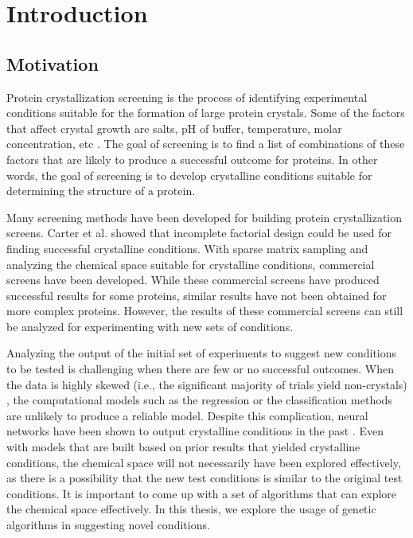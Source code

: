 \chapter{Introduction}
\label{ch:background}

\section{Motivation} \label{intro:motivation}
Protein crystallization screening is the process of identifying experimental conditions suitable for the formation of large protein crystals. Some of the factors that affect crystal growth are salts, pH of buffer, temperature, molar concentration, etc \cite{IntroFactor,History,McPherson}. The goal of screening is to find a list of combinations of these factors that are likely to produce a successful outcome for proteins. In other words, the goal of screening is to develop crystalline conditions suitable for determining the structure of a protein. 

Many screening methods have been developed for building protein crystallization screens. Carter et al. \cite{carter1979protein} showed that incomplete factorial design could be used for finding successful crystalline conditions. With sparse matrix sampling \cite{jancarik1991sparse} and analyzing the chemical space suitable for crystalline conditions, commercial screens have been developed. While these commercial screens have produced successful results for some proteins, similar results have not been obtained for more complex proteins. However, the results of these commercial screens can still be analyzed for experimenting with new sets of conditions.

Analyzing the output of the initial set of experiments to suggest new conditions to be tested is challenging when there are few or no successful outcomes. When the data is highly skewed (i.e., the significant majority of trials yield non-crystals) \cite{Skewed}, the computational models such as the regression  or the   classification methods are unlikely to produce a reliable model. Despite this complication, neural networks have been shown to output crystalline conditions in the past \cite{delucas2003efficient}. 
Even with models that are built based on prior results that yielded crystalline conditions, the chemical space will not necessarily have been explored effectively, as there is a possibility that the new test conditions is similar to the original test conditions. It is important to come up with a set of algorithms that can explore the chemical space effectively. In this thesis, we explore the usage of genetic algorithms in suggesting novel conditions. 

